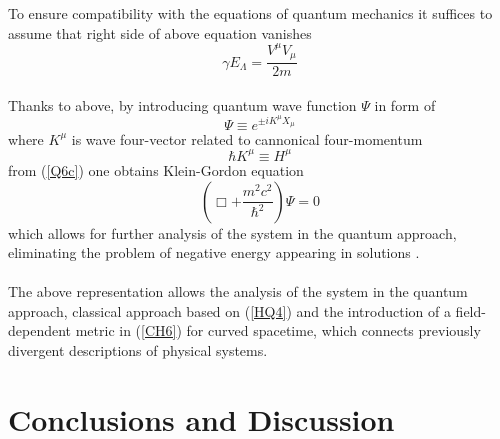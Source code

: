 \documentclass[aps,prx,preprint,groupedaddress,showkeys]{revtex4-2}
\begin{document}
To ensure compatibility with the equations of quantum mechanics it suffices to assume that right side of above equation vanishes
\begin{equation} \label{Q7}
\gamma E_{\Lambda} = \frac{V^{\mu} V_{\mu}}{2m} 
\end{equation}
~\\
Thanks to above, by introducing quantum wave function $\Psi$ in form of 
\begin{equation} \label{Q8}
\Psi \equiv e^{\pm iK^{\mu} X_{\mu}}
\end{equation} 
where $K^{\mu}$ is wave four-vector related to cannonical four-momentum 
\begin{equation} \label{Q8b}
\hbar  K^{\mu} \equiv H^{\mu}
\end{equation}
from (\ref{Q6c}) one obtains Klein-Gordon equation
\begin{equation} \label{Q9}
\left ( \Box + \frac{m^2c^2}{\hbar^2} \right ) \Psi = 0
\end{equation} 
which allows for further analysis of the system in the quantum approach, eliminating the problem of negative energy appearing in solutions \cite{KGE}. \\
~\\
The above representation allows the analysis of the system in the quantum approach, classical approach based on (\ref{HQ4}) and the introduction of a field-dependent metric in (\ref{CH6}) for curved spacetime, which connects previously divergent descriptions of physical systems.

\section{Conclusions and Discussion} \label{3Chap}
\end{document}
